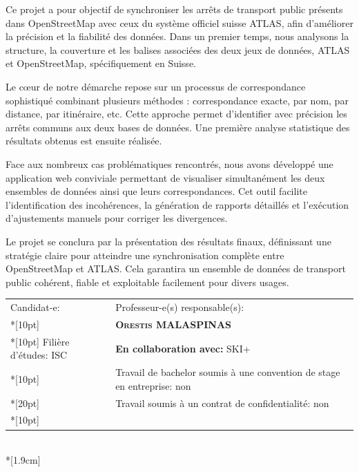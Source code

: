 \begin{spacing}{0.956}
\vspace{0.5cm}

Ce projet a pour objectif de synchroniser les arrêts de transport public présents dans OpenStreetMap avec ceux du système officiel suisse ATLAS, afin d’améliorer la précision et la fiabilité des données. Dans un premier temps, nous analysons la structure, la couverture et les balises associées des deux jeux de données, ATLAS et OpenStreetMap, spécifiquement en Suisse.

Le cœur de notre démarche repose sur un processus de correspondance sophistiqué combinant plusieurs méthodes : correspondance exacte, par nom, par distance, par itinéraire, etc. Cette approche permet d’identifier avec précision les arrêts communs aux deux bases de données. Une première analyse statistique des résultats obtenus est ensuite réalisée.

Face aux nombreux cas problématiques rencontrés, nous avons développé une application web conviviale permettant de visualiser simultanément les deux ensembles de données ainsi que leurs correspondances. Cet outil facilite l’identification des incohérences, la génération de rapports détaillés et l’exécution d’ajustements manuels pour corriger les divergences.

Le projet se conclura par la présentation des résultats finaux, définissant une stratégie claire pour atteindre une synchronisation complète entre OpenStreetMap et ATLAS. Cela garantira un ensemble de données de transport public cohérent, fiable et exploitable facilement pour divers usages.

\vfill
\begin{center}

\vfill

{
	\begin{tabular*}{16cm}{p{7.59cm} p{7.58cm}}
		\small Candidat-e:					&	\small Professeur-e(s) responsable(s):\\*[10pt]
		\small\textbf{\textsc{\Author}}		&	\small\textbf{\textsc{Orestis MALASPINAS}}\\*[10pt]
		\footnotesize  Filière d’études: ISC	&	\footnotesize  \textbf{En collaboration avec:} SKI+\\*[10pt]
		\footnotesize  {} & \footnotesize  Travail de bachelor soumis à une convention de stage en entreprise: non \\*[20pt]
		\footnotesize  {} & \footnotesize  Travail soumis à un contrat de confidentialité: non\\*[10pt]
	\end{tabular*}\\*[1.9cm]
}
	
\end{center}
\end{spacing}
